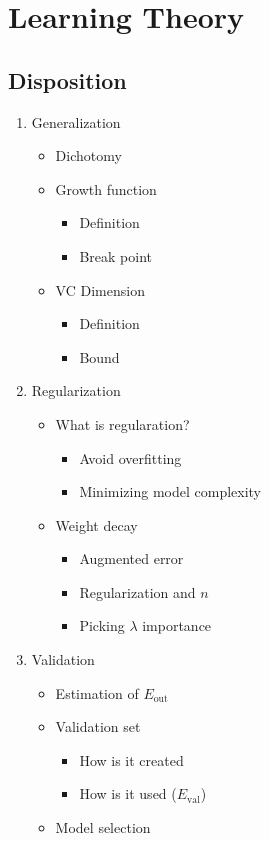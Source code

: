 \documentclass[a4, english]{article}
\begin{document}
\newpage

\section{Learning Theory}
\subsection{Disposition}
\begin{enumerate}
	\item Generalization
  \begin{itemize}
  	\item Dichotomy
    \item Growth function
    \begin{itemize}
    	\item Definition
      \item Break point
    \end{itemize}
  \item VC Dimension  
  \begin{itemize}
  	\item Definition
    \item Bound
  \end{itemize}
  \end{itemize}  
  \item Regularization
  \begin{itemize}
  	\item What is regularation?
    \begin{itemize}
    	\item Avoid overfitting
      \item Minimizing model complexity
    \end{itemize}
    \item Weight decay
    \begin{itemize}
    	\item Augmented error
      \item Regularization and $n$ 
      \item Picking $\lambda$ importance 
    \end{itemize}
  \end{itemize}
  \item Validation 
  \begin{itemize}
  	\item Estimation of $E_\text{out}$ 
    \item Validation set
    \begin{itemize}
    	\item How is it created
      \item How is it used ($E_\text{val}$)      
    \end{itemize}
    \item Model selection
  \end{itemize}
\end{enumerate}
\newpage
\end{document}
